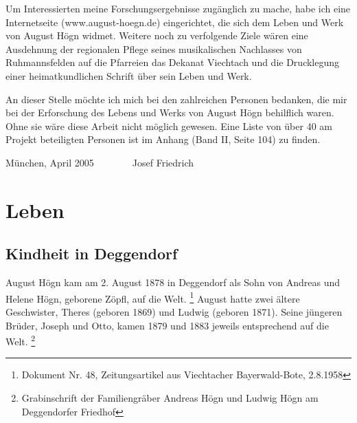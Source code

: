 \documentclass[a4paper]{article}
\begin{document}
Um Interessierten meine Forschungsergebnisse zugänglich zu mache, habe
ich eine Internetseite (www.august-hoegn.de) eingerichtet, die sich dem
Leben und Werk von August Högn widmet. Weitere noch zu verfolgende
Ziele wären eine Ausdehnung der regionalen Pflege seines musikalischen
Nachlasses von Ruhmannsfelden auf die Pfarreien das Dekanat Viechtach
und die Drucklegung einer heimatkundlichen Schrift über sein Leben und
Werk.

An dieser Stelle möchte ich mich bei den zahlreichen Personen bedanken,
die mir bei der Erforschung des Lebens und Werks von August Högn
behilflich waren. Ohne sie wäre diese Arbeit nicht möglich gewesen.
Eine Liste von über 40 am Projekt beteiligten Personen ist im Anhang
(Band II, Seite 104) zu finden.

München, April 2005\ \ \ \ \ \ \ \ Josef Friedrich

\section{Leben}
\hypertarget{RefHeadingToc100333725}{}\subsection{Kindheit in
Deggendorf}
\hypertarget{RefHeadingToc100333726}{}August Högn kam am 2. August 1878
in Deggendorf als Sohn von Andreas und Helene Högn, geborene Zöpfl, auf
die Welt. \footnote{Dokument Nr. 48, Zeitungsartikel aus Viechtacher
Bayerwald-Bote, 2.8.1958} August hatte zwei ältere Geschwister, Theres
(geboren 1869) und Ludwig (geboren 1871). Seine jüngeren Brüder, Joseph
und Otto, kamen 1879 und 1883 jeweils entsprechend auf die
Welt. \footnote{Grabinschrift der Familiengräber Andreas Högn und
Ludwig Högn am Deggendorfer Friedhof}
\end{document}
